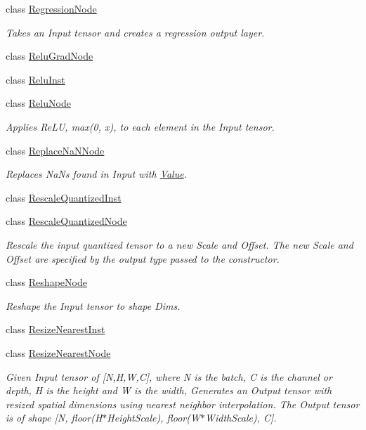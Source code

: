 \begin{DoxyCompactItemize}
class \hyperlink{classglow_1_1_regression_node}{Regression\+Node}
\begin{DoxyCompactList}\small\item\em Takes an Input tensor and creates a regression output layer. \end{DoxyCompactList}\item 
class \hyperlink{classglow_1_1_relu_grad_node}{Relu\+Grad\+Node}
\item 
class \hyperlink{classglow_1_1_relu_inst}{Relu\+Inst}
\item 
class \hyperlink{classglow_1_1_relu_node}{Relu\+Node}
\begin{DoxyCompactList}\small\item\em Applies Re\+LU, max(0, x), to each element in the Input tensor. \end{DoxyCompactList}\item 
class \hyperlink{classglow_1_1_replace_na_n_node}{Replace\+Na\+N\+Node}
\begin{DoxyCompactList}\small\item\em Replaces Na\+Ns found in Input with \hyperlink{classglow_1_1_value}{Value}. \end{DoxyCompactList}\item 
class \hyperlink{classglow_1_1_rescale_quantized_inst}{Rescale\+Quantized\+Inst}
\item 
class \hyperlink{classglow_1_1_rescale_quantized_node}{Rescale\+Quantized\+Node}
\begin{DoxyCompactList}\small\item\em Rescale the input quantized tensor to a new Scale and Offset. The new Scale and Offset are specified by the output type passed to the constructor. \end{DoxyCompactList}\item 
class \hyperlink{classglow_1_1_reshape_node}{Reshape\+Node}
\begin{DoxyCompactList}\small\item\em Reshape the Input tensor to shape Dims. \end{DoxyCompactList}\item 
class \hyperlink{classglow_1_1_resize_nearest_inst}{Resize\+Nearest\+Inst}
\item 
class \hyperlink{classglow_1_1_resize_nearest_node}{Resize\+Nearest\+Node}
\begin{DoxyCompactList}\small\item\em Given Input tensor of \mbox{[}N,H,W,C\mbox{]}, where N is the batch, C is the channel or depth, H is the height and W is the width, Generates an Output tensor with resized spatial dimensions using nearest neighbor interpolation. The Output tensor is of shape \mbox{[}N, floor(\+H$\ast$\+Height\+Scale), floor(\+W$\ast$\+Width\+Scale), C\mbox{]}. \end{DoxyCompactList}\item 

\end{DoxyCompactItemize}
